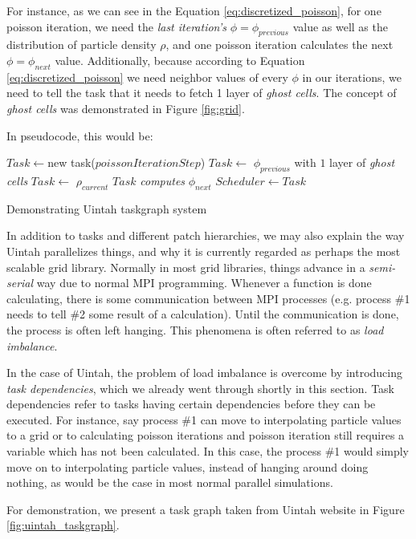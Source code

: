 \documentclass[notitlepage, 12pt]{article}
\begin{document}
For instance, as we can see in the Equation 
\ref{eq:discretized_poisson}, for one poisson iteration, we need the \emph{last iteration's} $\phi=\phi_{previous}$ value as well as the distribution of 
particle density $\rho$, and one poisson iteration calculates the next $\phi=\phi_{next}$ value. Additionally, because according to Equation \ref{eq:discretized_poisson} 
we need neighbor values of every $\phi$ in our iterations, we need to tell the task that it needs to fetch 1 layer of \emph{ghost cells}. The concept of 
\emph{ghost cells} was demonstrated in Figure \ref{fig:grid}.

In pseudocode, this would be:
\begin{algorithm}[H]
 \begin{algorithmic}
  \State $Task \gets $new task($poissonIterationStep$)
  \State $Task \gets$ $\phi_{previous}$ with $1$ layer of \emph{ghost cells}
  \State $Task \gets$ $\rho_{current}$
  \State $Task$ \emph{computes} $\phi_{next}$
  \State $Scheduler \gets Task$
 \end{algorithmic}
 \caption{Demonstrating Uintah taskgraph system}
 \label{alg:uintah_task}
\end{algorithm}

In addition to tasks and different patch hierarchies, we may also explain the way Uintah parallelizes things, and why it is currently regarded as perhaps 
the most scalable grid library. Normally in most grid libraries, things advance in a \emph{semi-serial} way due to normal MPI programming. Whenever 
a function is done calculating, there is some communication between MPI processes (e.g. process \#1 needs to tell \#2 some result of a calculation). Until the 
communication is done, the process is often left hanging. This phenomena is often referred to as \emph{load imbalance}.

In the case of Uintah, the problem of load imbalance is overcome by introducing \emph{task dependencies}, which we already went through shortly in this section. 
Task dependencies refer to tasks having certain dependencies before they can be executed. For instance, say process \#1 can move to interpolating particle 
values to a grid or to calculating poisson iterations and poisson iteration still requires a variable which has not been calculated. In this case, the 
process \#1 would simply move on to interpolating particle values, instead of hanging around doing nothing, as would be the case in most normal parallel 
simulations.

For demonstration, we present a task graph taken from Uintah website in Figure \ref{fig:uintah_taskgraph}.
\end{document}
